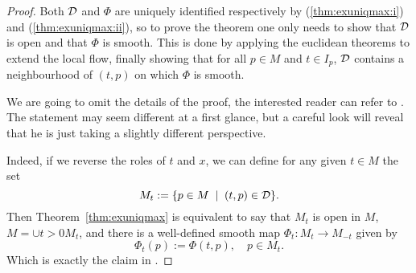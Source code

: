 \begin{proof}
  Both $\mathcal{D}$ and $\Phi$ are uniquely identified respectively by (\ref{thm:exuniqmax:i}) and (\ref{thm:exuniqmax:ii}), so to prove the theorem one only needs to show that $\mathcal{D}$ is open and that $\Phi$ is smooth.
  This is done by applying the euclidean theorems to extend the local flow, finally showing that for all $p\in M$ and $t\in I_p$, $\mathcal{D}$ contains a neighbourhood of $(t,p)$ on which $\Phi$ is smooth.

  We are going to omit the details of the proof, the interested reader can refer to \cite[Proposition 9.12]{book:lee}.
  The statement may seem different at a first glance, but a careful look will reveal that he is just taking a slightly different perspective.

  Indeed, if we reverse the roles of $t$ and $x$, we can define for any given $t\in M$ the set
  \begin{equation}
    M_t := \{p\in M \;\mid\; (t,p)\in\mathcal{D}\}.
  \end{equation}
  Then Theorem~\ref{thm:exuniqmax} is equivalent to say that $M_t$ is open in $M$, $M = \cup{t>0} M_t$, and there is a well-defined smooth map $\Phi_t : M_t \to M_{-t}$ given by
  \begin{equation}\label{eq:flowdiffeo}
    \Phi_t(p) := \Phi(t,p), \quad p\in M_t.
  \end{equation}
  Which is exactly the claim in \cite[Proposition 9.12]{book:lee}.





\end{proof}
